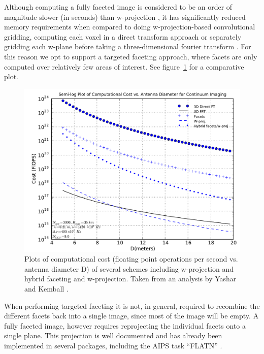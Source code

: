 \documentclass[a4paper, two column]{article}
\begin{document}
Although computing a fully faceted image is considered to be an order of magnitude slower (in seconds) than w-projection \cite{1416440}, it has significantly reduced memory requirements when compared 
to doing w-projection-based convolutional gridding, computing each voxel in a direct transform approach or separately gridding each w-plane before taking a three-dimensional fourier 
transform \cite{yashar2009tdp}. For this reason we opt to support a targeted faceting approach, where facets are only computed over relatively few areas of interest. 
See figure~\ref{IMG_PERFORMANCE_COMPARISON} for a comparative plot.
\begin{figure}
 \begin{mdframed}
  \includegraphics[width=1.0\textwidth]{performance_faceting.png}
  \caption{Plots of computational cost (floating point operations per second vs. antenna diameter D) of several schemes including w-projection and hybrid faceting and w-projection. Taken from an analysis by Yashar and Kemball \cite{yashar2009tdp}.}
  \label{IMG_PERFORMANCE_COMPARISON}
 \end{mdframed}
\end{figure}

When performing targeted faceting it is not, in general, required to recombine the different facets back into a single image, since most of the image will be empty. A fully faceted image, however 
requires reprojecting the individual facets onto a single plane. This projection \cite{sault1996approach} is well documented and has already been implemented in several packages, including 
the AIPS task ``FLATN'' \cite{AIPS113}.
\end{document}

